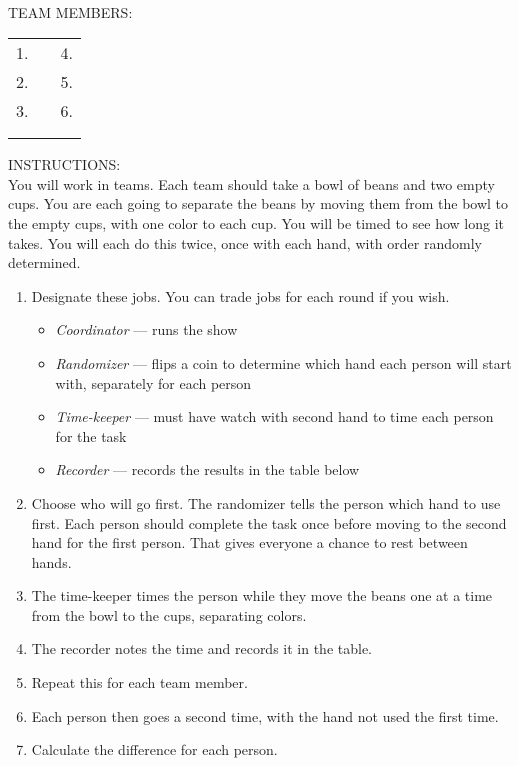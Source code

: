 \pagebreak
\begin{flushleft}
\textbf{} \\
\end{flushleft}

\noindent TEAM MEMBERS:\\ 
\vspace{10pt}
\begin{tabular}{p{2in}p{1in}p{2in}}
1. \hrulefill & & 4. \hrulefill  \\
2. \hrulefill & & 5. \hrulefill  \\
3. \hrulefill & & 6. \hrulefill  \\ \\ \\
\end{tabular}

\noindent INSTRUCTIONS:\\ 
You will work in teams. Each team should take a bowl of beans and two empty cups. You are each going to separate the beans by moving them from the bowl to the empty cups, with one color to each cup. You will be timed to see how long it takes. You will each do this twice, once with each hand, with order randomly determined.

\renewcommand{\labelenumi}{\arabic{enumi}.}
\begin{enumerate} [leftmargin=1cm, itemsep=.2em]
\item Designate these jobs. You can trade jobs for each round if you wish.
	\renewcommand{\labelitemi}{$\filledsquare$}
	\begin{itemize} [leftmargin=1cm, itemsep=.2em]
	\item \textit{Coordinator} --- runs the show
	\item \textit{Randomizer} --- flips a coin to determine which hand each person will start with, separately for each person
	\item \textit{Time-keeper} --- must have watch with second hand to time each person for the task
	\item \textit{Recorder} --- records the results in the table below
	\end{itemize}
\item Choose who will go first. The randomizer tells the person which hand to use first. Each person should complete the task once before moving to the second hand for the first person. That gives everyone a chance to rest between hands.
\item The time-keeper times the person while they move the beans one at a time from the bowl to the cups, separating colors. 
\item The recorder notes the time and records it in the table.
\item Repeat this for each team member.
\item Each person then goes a second time, with the hand not used the first time.
\item Calculate the difference for each person.
\end{enumerate}
\pagebreak

